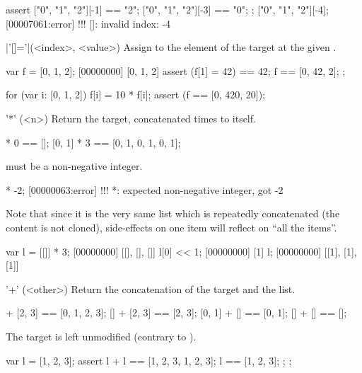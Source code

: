 \begin{urbiscriptapi}
\begin{urbiscript}
assert
{
  ["0", "1", "2"][-1] == "2";
  ["0", "1", "2"][-3] == "0";
};
["0", "1", "2"][-4];
[00007061:error] !!! []: invalid index: -4
\end{urbiscript}

\item|'[]='|(<index>, <value>)%
  Assign  to the element of the target at the given
  .

\begin{urbiscript}
var f = [0, 1, 2];
[00000000] [0, 1, 2]
assert
{
  (f[1] = 42) == 42;
  f == [0, 42, 2];
};

for (var i: [0, 1, 2])
  f[i] = 10 * f[i];
assert (f == [0, 420, 20]);
\end{urbiscript}

\item['*'](<n>)%
  Return the target, concatenated  times to itself.
\begin{urbiassert}
[0, 1] * 0 == [];
[0, 1] * 3 == [0, 1, 0, 1, 0, 1];
\end{urbiassert}

   must be a non-negative integer.

\begin{urbiscript}
[0, 1] * -2;
[00000063:error] !!! *: expected non-negative integer, got -2
\end{urbiscript}


  Note that since it is the very same list which is repeatedly
  concatenated (the content is not cloned), side-effects on one item
  will reflect on ``all the items''.

\begin{urbiscript}
var l = [[]] * 3;
[00000000] [[], [], []]
l[0] << 1;
[00000000] [1]
l;
[00000000] [[1], [1], [1]]
\end{urbiscript}

\item['+'](<other>)%
  Return the concatenation of the target and the  list.

\begin{urbiassert}
[0, 1] + [2, 3] == [0, 1, 2, 3];
    [] + [2, 3] == [2, 3];
[0, 1] + []     == [0, 1];
    [] + []     == [];
\end{urbiassert}

The target is left unmodified (contrary to ).
\begin{urbiscript}
{
  var l = [1, 2, 3];
  assert
  {
    l + l == [1, 2, 3, 1, 2, 3];
    l     == [1, 2, 3];
  };
};
\end{urbiscript}


\end{urbiscriptapi}
